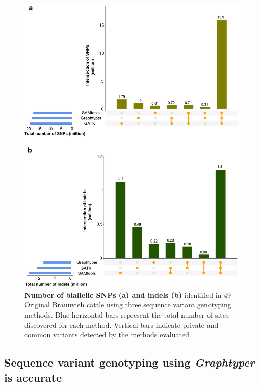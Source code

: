 \documentclass[../main.tex]{subfiles}
\begin{document}
\newpage
\begin{figure}[!htb]
    \centering
    \includegraphics[width=\textwidth]{paper1/main_figure/Figure2.pdf}
    \caption[Number of biallelic variants identified in 49 Original Braunvieh cattle]{\textbf{Number of biallelic SNPs (a) and indels (b)} identified in 49 Original Braunvieh cattle using three sequence variant genotyping methods. Blue horizontal bars represent the total number of sites discovered for each method. Vertical bars indicate private and common variants detected by the methods evaluated}
    \label{fig:varoverlap}
\end{figure}

\newpage

\subsection*{Sequence variant genotyping using \emph{Graphtyper} is accurate}
\end{document}
